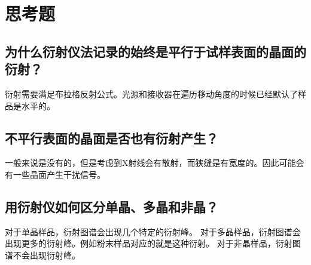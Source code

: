 \documentclass[a4paper]{article}
\begin{document}
\section{思考题}
\subsection*{为什么衍射仪法记录的始终是平行于试样表面的晶面的衍射？}
衍射需要满足布拉格反射公式。光源和接收器在遍历移动角度的时候已经默认了样品是水平的。
\subsection*{不平行表面的晶面是否也有衍射产生？}
一般来说是没有的，但是考虑到X射线会有散射，而狭缝是有宽度的。因此可能会有一些晶面产生干扰信号。
\subsection*{用衍射仪如何区分单晶、多晶和非晶？}
对于单晶样品，衍射图谱会出现几个特定的衍射峰。
对于多晶样品，衍射图谱会出现更多的衍射峰。例如粉末样品对应的就是这种衍射。
对于非晶样品，衍射图谱不会出现衍射峰。

\nocite{jiaocai}

\end{document}
